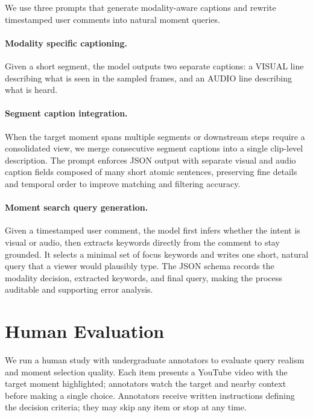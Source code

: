 \documentclass[11pt]{article}
\begin{document}
We use three prompts that generate modality-aware captions and rewrite timestamped user comments into natural moment queries.

\paragraph{Modality specific captioning.}
Given a short segment, the model outputs two separate captions: a VISUAL line describing what is seen in the sampled frames, and an AUDIO line describing what is heard.


\paragraph{Segment caption integration.}
When the target moment spans multiple segments or downstream steps require a consolidated view, we merge consecutive segment captions into a single clip-level description.
The prompt enforces JSON output with separate visual and audio caption fields composed of many short atomic sentences, preserving fine details and temporal order to improve matching and filtering accuracy.


\paragraph{Moment search query generation.}
Given a timestamped user comment, the model first infers whether the intent is visual or audio, then extracts keywords directly from the comment to stay grounded.
It selects a minimal set of focus keywords and writes one short, natural query that a viewer would plausibly type.
The JSON schema records the modality decision, extracted keywords, and final query, making the process auditable and supporting error analysis.


\section{Human Evaluation}
\label{sec:human_appendix}
We run a human study with undergraduate annotators to evaluate query realism and moment selection quality.
Each item presents a YouTube video with the target moment highlighted; annotators watch the target and nearby context before making a single choice.
Annotators receive written instructions defining the decision criteria; they may skip any item or stop at any time.
\end{document}
